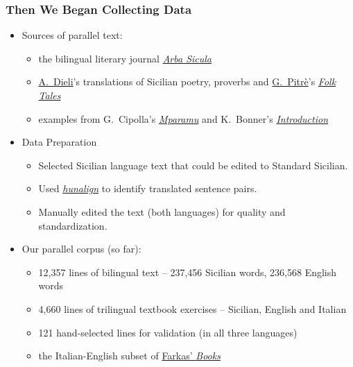 \documentclass{beamer}
\begin{document}
\begin{frame}
  \frametitle{Then We Began Collecting Data}
  \vspace{-1.0em}
  \begin{itemize}
  \item Sources of parallel text:
    \begin{itemize}
    \item the bilingual literary journal \href{https://www.arbasicula.org/}{\textit{Arba Sicula}}
    \item \href{http://www.dieli.net/}{A.~Dieli}'s translations of Sicilian poetry, proverbs and \href{https://en.wikipedia.org/wiki/Giuseppe_Pitr\%C3\%A8}{G.~Pitrè}'s \href{https://scn.wikipedia.org/wiki/F\%C3\%A0uli,_nueddi_e_cunti_pupulari_siciliani}{\textit{Folk Tales}}
    \item examples from G.~Cipolla's \href{http://www.arbasicula.org/LegasOnlineStore.html\#!/26-Learn-Sicilian-Mparamu-lu-sicilianu-by-Gaetano-Cipolla/p/82865121/category=0}{\textit{Mparamu}} and K.~Bonner's \href{http://www.arbasicula.org/LegasOnlineStore.html\#!/28-An-Introduction-to-Sicilian-Grammar-by-J-K-Kirk-Bonner-Edited-by-Gaetano-Cipolla/p/82865123/category=0}{\textit{Introduction}}
   \end{itemize}
  \vspace{0.5em}
  \item Data Preparation
    \begin{itemize}
    \item Selected Sicilian language text that could be edited to Standard Sicilian.
    \item Used \href{https://github.com/danielvarga/hunalign}{\textit{hunalign}} to identify translated sentence pairs.
    \item Manually edited the text (both languages) for quality and standardization.
    \end{itemize}
  \vspace{0.5em}
  \item Our parallel corpus (so far):
    \begin{itemize}
    \item 12,357 lines of bilingual text -- 237,456 Sicilian words, 236,568 English words
    \item 4,660 lines of trilingual textbook exercises -- Sicilian, English and Italian
    \item 121 hand-selected lines for validation {\small{(in all three languages)}}
    \item the Italian-English subset of \href{https://farkastranslations.com/bilingual_books.php}{Farkas' \textit{Books}}
    \end{itemize}
  \end{itemize} 
\end{frame}
\end{document}
